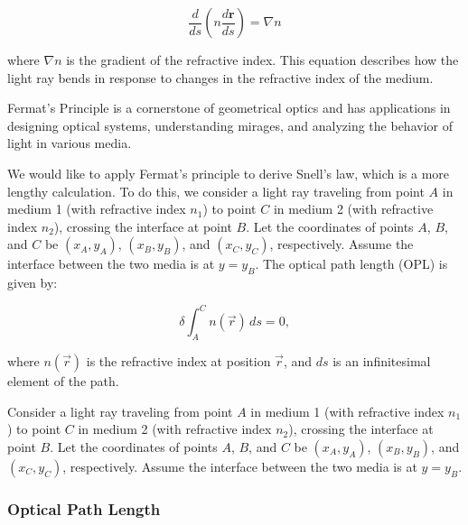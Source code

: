 \documentclass[
  a4paper,
]{book}
\begin{document}
\[
\frac{d}{ds} \left( n \frac{d\mathbf{r}}{ds} \right) = \nabla n
\]

where \(\nabla n\) is the gradient of the refractive index. This
equation describes how the light ray bends in response to changes in the
refractive index of the medium.

Fermat's Principle is a cornerstone of geometrical optics and has
applications in designing optical systems, understanding mirages, and
analyzing the behavior of light in various media.

\begin{tcolorbox}[enhanced jigsaw, coltitle=black, title=\textcolor{quarto-callout-tip-color}{\faLightbulb}\hspace{0.5em}{Fermat's Principle and Snells Law}, colframe=quarto-callout-tip-color-frame, toprule=.15mm, opacitybacktitle=0.6, left=2mm, opacityback=0, breakable, toptitle=1mm, bottomtitle=1mm, leftrule=.75mm, arc=.35mm, titlerule=0mm, colbacktitle=quarto-callout-tip-color!10!white, rightrule=.15mm, bottomrule=.15mm, colback=white]

We would like to apply Fermat's principle to derive Snell's law, which
is a more lengthy calculation. To do this, we consider a light ray
traveling from point \(A\) in medium 1 (with refractive index \(n_1\))
to point \(C\) in medium 2 (with refractive index \(n_2\)), crossing the
interface at point \(B\). Let the coordinates of points \(A\), \(B\),
and \(C\) be \((x_A, y_A)\), \((x_B, y_B)\), and \((x_C, y_C)\),
respectively. Assume the interface between the two media is at
\(y = y_B\). The optical path length (OPL) is given by:

\[
\delta \int_{A}^{C} n(\vec{r}) \, ds = 0,
\]

where \(n(\vec{r})\) is the refractive index at position \(\vec{r}\),
and \(ds\) is an infinitesimal element of the path.

Consider a light ray traveling from point \(A\) in medium 1 (with
refractive index \(n_1\)) to point \(C\) in medium 2 (with refractive
index \(n_2\)), crossing the interface at point \(B\). Let the
coordinates of points \(A\), \(B\), and \(C\) be \((x_A, y_A)\),
\((x_B, y_B)\), and \((x_C, y_C)\), respectively. Assume the interface
between the two media is at \(y = y_B\).

\subsubsection{Optical Path Length}\label{optical-path-length}


\end{tcolorbox}
\end{document}
